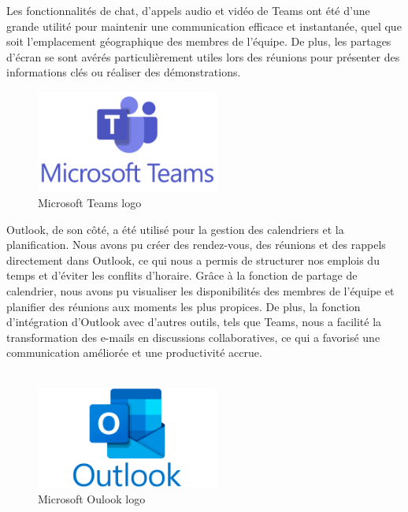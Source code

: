 Les fonctionnalités de chat, d'appels audio et vidéo de Teams ont été d'une grande utilité pour maintenir une communication efficace et instantanée, quel que soit l'emplacement géographique des membres de l'équipe. De plus, les partages d'écran se sont avérés particulièrement utiles lors des réunions pour présenter des informations clés ou réaliser des démonstrations.\\

\begin{figure}[H]
    \centering
    \includegraphics[width=6cm]{Figures/Microsoft_Teams.png}
    \caption{Microsoft Teams logo}
\end{figure}


Outlook, de son côté, a été utilisé pour la gestion des calendriers et la planification. Nous avons pu créer des rendez-vous, des réunions et des rappels directement dans Outlook, ce qui nous a permis de structurer nos emplois du temps et d'éviter les conflits d'horaire. Grâce à la fonction de partage de calendrier, nous avons pu visualiser les disponibilités des membres de l'équipe et planifier des réunions aux moments les plus propices. De plus, la fonction d'intégration d'Outlook avec d'autres outils, tels que Teams, nous a facilité la transformation des e-mails en discussions collaboratives, ce qui a favorisé une communication améliorée et une productivité accrue.
\\
\\
\begin{figure}[H]
    \centering
    \includegraphics[width=6cm]{Figures/outlook.png}
    \caption{Microsoft Oulook logo}
\end{figure}



